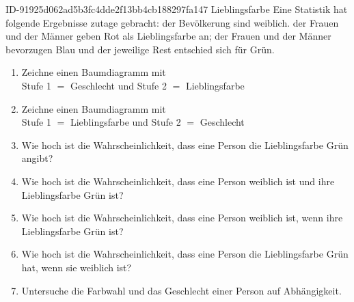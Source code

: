 \begin{exercise}
      {ID-91925d062ad5b3fc4dde2f13bb4cb188297fa147}
      {Lieblingsfarbe}
  \ifproblem\problem
    Eine Statistik hat folgende Ergebnisse zutage gebracht:  der
    Bevölkerung sind weiblich.  der Frauen und  der Männer
    geben Rot als Lieblingsfarbe an;  der Frauen und  der
    Männer bevorzugen Blau und der jeweilige Rest entschied sich für Grün.
    \begin{enumerate}
      \item Zeichne einen Baumdiagramm mit\\
            Stufe 1 $=$ Geschlecht und
            Stufe 2 $=$ Lieblingsfarbe
      \item Zeichne einen Baumdiagramm mit\\
            Stufe 1 $=$ Lieblingsfarbe und
            Stufe 2 $=$ Geschlecht
      \item Wie hoch ist die Wahrscheinlichkeit, dass eine Person die
            Lieblingsfarbe Grün angibt?
      \item Wie hoch ist die Wahrscheinlichkeit, dass eine Person weiblich
            ist und ihre Lieblingsfarbe Grün ist?
      \item Wie hoch ist die Wahrscheinlichkeit, dass eine Person weiblich ist,
            wenn ihre Lieblingsfarbe Grün ist?
      \item Wie hoch ist die Wahrscheinlichkeit, dass eine Person die
            Lieblingsfarbe Grün hat, wenn sie weiblich ist?
      \item Untersuche die Farbwahl und das Geschlecht einer Person
            auf Abhängigkeit.
    \end{enumerate}
  \fi
\end{exercise}
